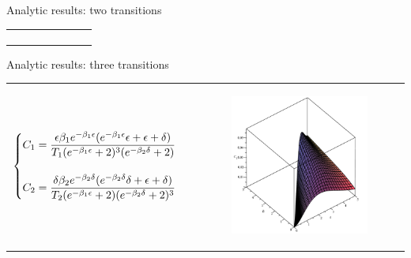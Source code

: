 \begin{frame}{Analytic results: two transitions}
\begin{tabular}{l l}
\begin{minipage}{0.38\textwidth}
\begin{figure}
			\end{figure}
		\end{minipage}
	\end{tabular}
\end{frame}


\begin{frame}{Analytic results: three transitions}

	\begin{tabular}{l l}
		\begin{minipage}{0.62\textwidth}
			\begin{equation*}
				\begin{cases}
				C_1 = \dfrac{\epsilon\beta_1 e^{-\beta_1\epsilon} (e^{-\beta_1\epsilon}\epsilon+\epsilon+\delta)}
				{T_1(e^{-\beta_1\epsilon} + 2)^3 (e^{-\beta_2\delta} + 2)}\\
				\vspace{0pt}\\
				C_2 = \dfrac{\delta\beta_2 e^{-\beta_2\delta} (e^{-\beta_2\delta}\delta+\epsilon+\delta)}
				{T_2(e^{-\beta_1\epsilon} + 2) (e^{-\beta_2\delta} + 2)^3}
				\end{cases}
			\end{equation*}
		\end{minipage}
		&
		\begin{minipage}{0.38\textwidth}
			\vspace{-15pt}
			\begin{figure}
				\centering
				\includegraphics[height=0.44\textheight,keepaspectratio=true]{../src/plot/discreteSystems/C1InFunctionOfEpsilonAndDelta_2-eps-converted-to.pdf}

\end{figure}
\end{minipage}
\end{tabular}
\end{frame}

